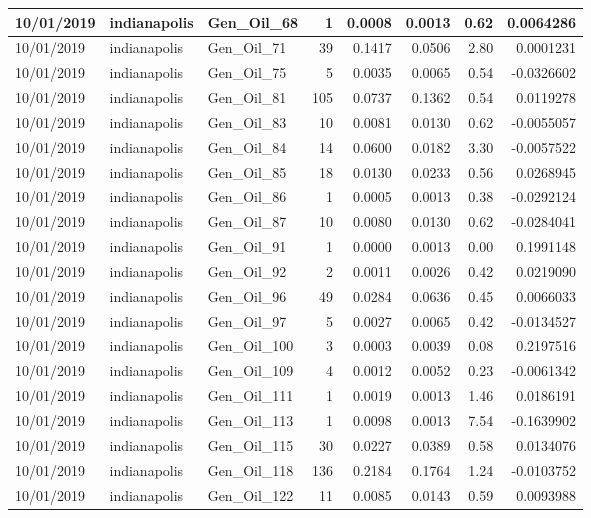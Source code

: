 \documentclass[
  letterpaper,
  DIV=11,
  numbers=noendperiod]{scrartcl}
\begin{document}
\begin{tabular}{l|l|l|r|r|r|r|r}
\hline
10/01/2019 & indianapolis & Gen\_Oil\_68 & 1 & 0.0008 & 0.0013 & 0.62 & 0.0064286\\
\hline
10/01/2019 & indianapolis & Gen\_Oil\_71 & 39 & 0.1417 & 0.0506 & 2.80 & 0.0001231\\
\hline
10/01/2019 & indianapolis & Gen\_Oil\_75 & 5 & 0.0035 & 0.0065 & 0.54 & -0.0326602\\
\hline
10/01/2019 & indianapolis & Gen\_Oil\_81 & 105 & 0.0737 & 0.1362 & 0.54 & 0.0119278\\
\hline
10/01/2019 & indianapolis & Gen\_Oil\_83 & 10 & 0.0081 & 0.0130 & 0.62 & -0.0055057\\
\hline
10/01/2019 & indianapolis & Gen\_Oil\_84 & 14 & 0.0600 & 0.0182 & 3.30 & -0.0057522\\
\hline
10/01/2019 & indianapolis & Gen\_Oil\_85 & 18 & 0.0130 & 0.0233 & 0.56 & 0.0268945\\
\hline
10/01/2019 & indianapolis & Gen\_Oil\_86 & 1 & 0.0005 & 0.0013 & 0.38 & -0.0292124\\
\hline
10/01/2019 & indianapolis & Gen\_Oil\_87 & 10 & 0.0080 & 0.0130 & 0.62 & -0.0284041\\
\hline
10/01/2019 & indianapolis & Gen\_Oil\_91 & 1 & 0.0000 & 0.0013 & 0.00 & 0.1991148\\
\hline
10/01/2019 & indianapolis & Gen\_Oil\_92 & 2 & 0.0011 & 0.0026 & 0.42 & 0.0219090\\
\hline
10/01/2019 & indianapolis & Gen\_Oil\_96 & 49 & 0.0284 & 0.0636 & 0.45 & 0.0066033\\
\hline
10/01/2019 & indianapolis & Gen\_Oil\_97 & 5 & 0.0027 & 0.0065 & 0.42 & -0.0134527\\
\hline
10/01/2019 & indianapolis & Gen\_Oil\_100 & 3 & 0.0003 & 0.0039 & 0.08 & 0.2197516\\
\hline
10/01/2019 & indianapolis & Gen\_Oil\_109 & 4 & 0.0012 & 0.0052 & 0.23 & -0.0061342\\
\hline
10/01/2019 & indianapolis & Gen\_Oil\_111 & 1 & 0.0019 & 0.0013 & 1.46 & 0.0186191\\
\hline
10/01/2019 & indianapolis & Gen\_Oil\_113 & 1 & 0.0098 & 0.0013 & 7.54 & -0.1639902\\
\hline
10/01/2019 & indianapolis & Gen\_Oil\_115 & 30 & 0.0227 & 0.0389 & 0.58 & 0.0134076\\
\hline
10/01/2019 & indianapolis & Gen\_Oil\_118 & 136 & 0.2184 & 0.1764 & 1.24 & -0.0103752\\
\hline
10/01/2019 & indianapolis & Gen\_Oil\_122 & 11 & 0.0085 & 0.0143 & 0.59 & 0.0093988\\

\end{tabular}
\end{document}
